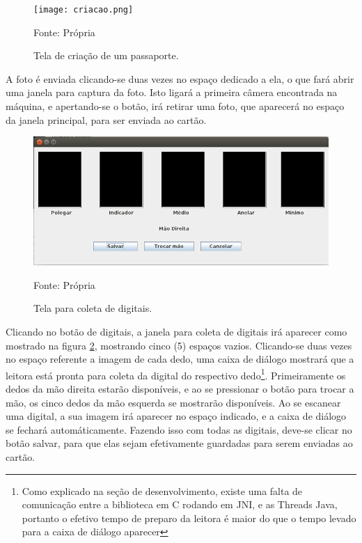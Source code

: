 \documentclass[11pt]{article}
\begin{document}
        \begin{figure}
    	    \begin{center}
              \caption{Tela de criação de um passaporte.}
    		  \texttt{[image: criacao.png]}
              
              {Fonte: Própria}
    		  \label{fig:criacao}
    	  \end{center}
    	\end{figure}
    
    	A foto é enviada clicando-se duas vezes no espaço dedicado a ela, o que fará abrir uma janela para captura da foto. Isto ligará a primeira câmera encontrada na máquina, e apertando-se o botão, irá retirar uma foto, que aparecerá no espaço da janela principal, para ser enviada ao cartão.
    	 
    	 \begin{figure}
    	    \begin{center}
    		  \caption{Tela para coleta de digitais.}
    		  \includegraphics[width=400pt]{digitais.png}
    		  \label{fig:digitais}
    		  
    		  {Fonte: Própria}
    	  \end{center}
    	\end{figure}
    	 
    	Clicando no botão de digitais, a janela para coleta de digitais irá aparecer como mostrado na figura \ref{fig:digitais}, mostrando cinco (5) espaços vazios. Clicando-se duas vezes no espaço referente a imagem de cada dedo, uma caixa de diálogo mostrará que a leitora está pronta para coleta da digital do respectivo dedo\footnote{Como explicado na seção de desenvolvimento, existe uma falta de comunicação entre a biblioteca em C rodando em JNI, e as Threads Java, portanto o efetivo tempo de preparo da leitora é maior do que o tempo levado para a caixa de diálogo aparecer}. Primeiramente os dedos da mão direita estarão disponíveis, e ao se pressionar o botão para trocar a mão, os cinco dedos da mão esquerda se mostrarão disponíveis. Ao se escanear uma digital, a sua imagem irá aparecer no espaço indicado, e a caixa de diálogo se fechará automáticamente. Fazendo isso com todas as digitais, deve-se clicar no botão salvar, para que elas sejam efetivamente guardadas para serem enviadas ao cartão.
    	 
\end{document}
